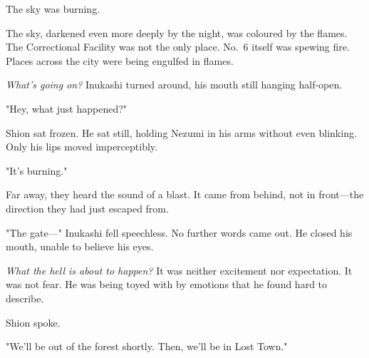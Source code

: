 The sky was burning.

The sky, darkened even more deeply by the night, was coloured by the
flames. The Correctional Facility was not the only place. No.~6 itself
was spewing fire. Places across the city were being engulfed in flames.

\emph{What's going on?} Inukashi turned around, his mouth still hanging
half-open.

"Hey, what just happened?"

Shion sat frozen. He sat still, holding Nezumi in his arms without even
blinking. Only his lips moved imperceptibly.

"\el It's burning."

Far away, they heard the sound of a blast. It came from behind, not in
front---the direction they had just escaped from.

"The gate---" Inukashi fell speechless. No further words came out. He
closed his mouth, unable to believe his eyes.

\emph{What the hell is about to happen?} It was neither excitement nor
expectation. It was not fear. He was being toyed with by emotions that
he found hard to describe.

Shion spoke.

"We'll be out of the forest shortly. Then, we'll be in Lost Town."